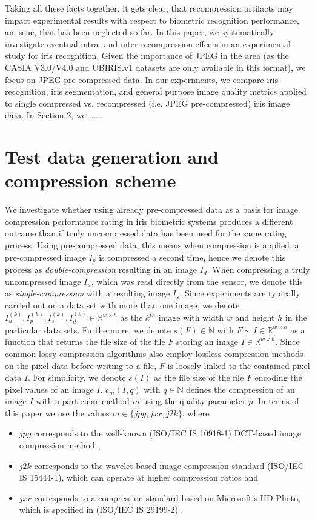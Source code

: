 \documentclass[10pt,twocolumn,letterpaper]{article}
\begin{document}
	Taking all these facts together, it gets clear, that recompression artifacts may impact experimental results with respect to biometric recognition
	performance, an issue, that has been neglected so far. In this paper, we systematically investigate eventual intra- and inter-recompression effects 
	in an experimental study
	for iris recognition. Given the importance of JPEG in the area (as the CASIA V3.0/V4.0 and UBIRIS.v1 datasets are only available in this format), we 
	focus on JPEG pre-compressed data. In our experiments, we compare iris recognition, iris segmentation, and general purpose image quality metrics applied
	to single compressed vs. recompressed (i.e. JPEG pre-compressed) iris image data. In Section 2, we ...... 
	

\section{Test data generation and compression scheme}
\label{section:comprScheme}
We investigate whether using already pre-compressed data as a basis for image compression performance rating in iris biometric systems produces a different outcame than if truly uncompressed data has been used for the same rating process. Using pre-compressed data, this means when compression is applied, a pre-compressed image $I_p$ is compressed a second time, hence we denote this process as \emph{double-compression} resulting in an image $I_d$. When compressing a truly uncompressed image $I_u$, which was read directly from the sensor, we denote this as \emph{single-compression} with a resulting image $I_s$. Since experiments are typically carried out on a data set with more than one image, we denote $I_u^{(k)}, I_p^{(k)}, I_s^{(k)}, I_d^{(k)} \in \mathbb{R}^{w \times h}$ as the $k^{th}$ image with width $w$ and height $h$ in the particular data sets. Furthermore, we denote $s(F) \in \mathbb{N}$ with $F \sim{I \in \mathbb{R}^{w \times h}}$ as a function that returns the file size of the file $F$ storing an image $I \in \mathbb{R}^{w \times h} $. Since common lossy compression algorithms also employ lossless compression methods on the pixel data before writing to a file, $F$ is loosely linked to the contained pixel data $I$. For simplicity, we denote $s(I)$ as the file size of the file $F$ encoding the pixel values of an image $I$. $c_{m}(I, q)$ with $q \in \mathbb{N}$ defines the compression of an image $I$ with a particular method $m$ using the quality parameter $p$. In terms of this paper we use the values $m \in \{jpg, jxr, j2k\}$, where 
\begin{itemize}
	\item $jpg$ corresponds to the well-known (ISO/IEC IS 10918-1) DCT-based image compression method \cite{jpg},
	\item $j2k$ corresponds to the wavelet-based image compression standard (ISO/IEC IS 15444-1), which can operate at higher compression ratios \cite{j2k} and
	\item $jxr$ corresponds to a compression standard based on Microsoft’s HD Photo, which is specified in (ISO/IEC IS 29199-2) \cite{jxr}.  
\end{itemize}
\end{document}

